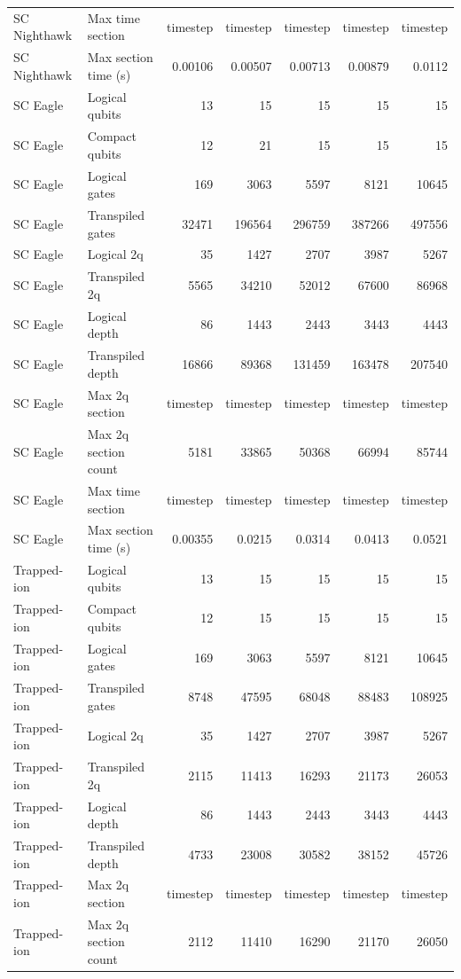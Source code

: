 \begin{table}
\begin{tabular}{llrrrrr}
SC Nighthawk & Max time section & timestep & timestep & timestep & timestep & timestep \\
SC Nighthawk & Max section time (s) & 0.00106 & 0.00507 & 0.00713 & 0.00879 & 0.0112 \\
\hline
SC Eagle & Logical qubits & 13 & 15 & 15 & 15 & 15 \\
SC Eagle & Compact qubits & 12 & 21 & 15 & 15 & 15 \\
SC Eagle & Logical gates & 169 & 3063 & 5597 & 8121 & 10645 \\
SC Eagle & Transpiled gates & 32471 & 196564 & 296759 & 387266 & 497556 \\
SC Eagle & Logical 2q & 35 & 1427 & 2707 & 3987 & 5267 \\
SC Eagle & Transpiled 2q & 5565 & 34210 & 52012 & 67600 & 86968 \\
SC Eagle & Logical depth & 86 & 1443 & 2443 & 3443 & 4443 \\
SC Eagle & Transpiled depth & 16866 & 89368 & 131459 & 163478 & 207540 \\
SC Eagle & Max 2q section & timestep & timestep & timestep & timestep & timestep \\
SC Eagle & Max 2q section count & 5181 & 33865 & 50368 & 66994 & 85744 \\
SC Eagle & Max time section & timestep & timestep & timestep & timestep & timestep \\
SC Eagle & Max section time (s) & 0.00355 & 0.0215 & 0.0314 & 0.0413 & 0.0521 \\
\hline
Trapped-ion & Logical qubits & 13 & 15 & 15 & 15 & 15 \\
Trapped-ion & Compact qubits & 12 & 15 & 15 & 15 & 15 \\
Trapped-ion & Logical gates & 169 & 3063 & 5597 & 8121 & 10645 \\
Trapped-ion & Transpiled gates & 8748 & 47595 & 68048 & 88483 & 108925 \\
Trapped-ion & Logical 2q & 35 & 1427 & 2707 & 3987 & 5267 \\
Trapped-ion & Transpiled 2q & 2115 & 11413 & 16293 & 21173 & 26053 \\
Trapped-ion & Logical depth & 86 & 1443 & 2443 & 3443 & 4443 \\
Trapped-ion & Transpiled depth & 4733 & 23008 & 30582 & 38152 & 45726 \\
Trapped-ion & Max 2q section & timestep & timestep & timestep & timestep & timestep \\
Trapped-ion & Max 2q section count & 2112 & 11410 & 16290 & 21170 & 26050 \\

\end{tabular}
\end{table}
